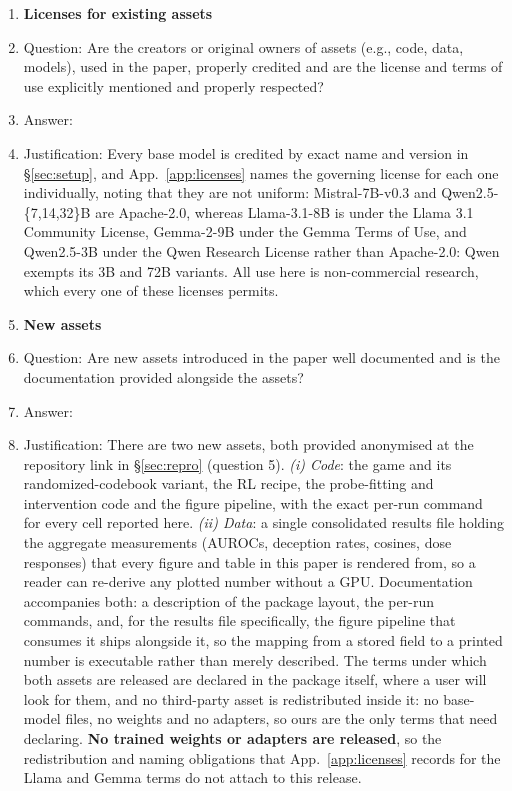\begin{enumerate}
\item {\bf Licenses for existing assets}
    \item[] Question: Are the creators or original owners of assets (e.g., code, data, models), used in the paper, properly credited and are the license and terms of use explicitly mentioned and properly respected?
    \item[] Answer: \answerYes{}
    \item[] Justification: Every base model is credited by exact name and version in \S\ref{sec:setup}, and App.~\ref{app:licenses} names the governing license for each one individually, noting that they are not uniform: Mistral-7B-v0.3 and Qwen2.5-\{7,14,32\}B are Apache-2.0, whereas Llama-3.1-8B is under the Llama 3.1 Community License, Gemma-2-9B under the Gemma Terms of Use, and Qwen2.5-3B under the Qwen Research License rather than Apache-2.0: Qwen exempts its 3B and 72B variants. All use here is non-commercial research, which every one of these licenses permits.
\item {\bf New assets}
    \item[] Question: Are new assets introduced in the paper well documented and is the documentation provided alongside the assets?
    \item[] Answer: \answerYes{}
    \item[] Justification: There are two new assets, both provided anonymised at the repository link in \S\ref{sec:repro} (question 5). \emph{(i) Code}: the game and its randomized-codebook variant, the RL recipe, the probe-fitting and intervention code and the figure pipeline, with the exact per-run command for every cell reported here. \emph{(ii) Data}: a single consolidated results file holding the aggregate measurements (AUROCs, deception rates, cosines, dose responses) that every figure and table in this paper is rendered from, so a reader can re-derive any plotted number without a GPU. Documentation accompanies both: a description of the package layout, the per-run commands, and, for the results file specifically, the figure pipeline that consumes it ships alongside it, so the mapping from a stored field to a printed number is executable rather than merely described. The terms under which both assets are released are declared in the package itself, where a user will look for them, and no third-party asset is redistributed inside it: no base-model files, no weights and no adapters, so ours are the only terms that need declaring. \textbf{No trained weights or adapters are released}, so the redistribution and naming obligations that App.~\ref{app:licenses} records for the Llama and Gemma terms do not attach to this release.

\end{enumerate}
